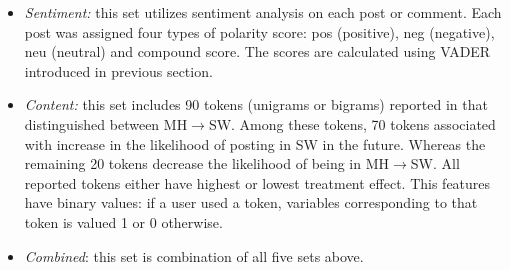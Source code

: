 \begin{itemize}
\item \textit{Sentiment:} this set utilizes sentiment analysis on each post or comment. Each post was assigned four types of polarity score: pos (positive), neg (negative), neu (neutral) and compound score. The scores are calculated using VADER \cite{Hutto2014} introduced in previous section.
\item \textit{Content:} this set includes 90 tokens (unigrams or bigrams) reported in \cite{DeChoudhury2016} that distinguished between MH$\rightarrow$SW. Among these tokens, 70 tokens associated with increase in the likelihood of posting in SW in the future. Whereas the remaining 20 tokens decrease the likelihood of being in MH$\rightarrow$SW. All reported tokens either have highest or lowest treatment effect. This features have binary values:  if a user used a token, variables corresponding to that token is valued 1 or 0 otherwise.
\item \textit{Combined}: this set is combination of all five sets above.
\end{itemize}
